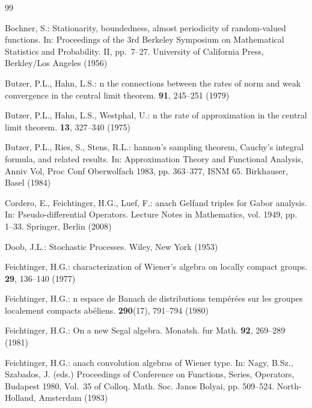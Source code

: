 \documentclass[graybox]{svmult}
\begin{document}

\begin{thebibliography}{99}

 Bochner, S.: Stationarity, boundedness, almost
   periodicity of random-valued functions. In: Proceedings of the 3rd
   Berkeley Symposium on Mathematical Statistics and Probability.  II,
   pp.~7--27.  University of California Press, Berkley/Los Angeles
   (1956)


Butzer, P.L., Hahn, L.S.:
n the connections between the rates of norm and weak convergence
in the central limit theorem.
 {\bf 91}, 245--251 (1979)

Butzer, P.L.,  Hahn, L.S.,  Westphal, U.:
n the rate of approximation in the central limit theorem.
 {\bf 13}, 327--340 (1975)

Butzer, P.L., Ries, S., Stens, R.L.:
hannon's sampling theorem, {C}auchy's integral formula, and
related results.
\newblock In: {{A}pproximation {T}heory and {F}unctional {A}nalysis, {A}nniv
{V}ol, {P}roc {C}onf {O}berwolfach 1983, pp. 363--377, ISNM 65}. Birkhauser, Basel
(1984)

Cordero, E., {F}eichtinger, H.G.,  Luef, F.:
anach {G}elfand triples for {G}abor analysis.
\newblock In: {{P}seudo-differential {O}perators}.  {{L}ecture {N}otes in {M}athematics},  vol. 1949, pp. 1--33. {S}pringer, {B}erlin (2008)

 Doob, J.L.: Stochastic Processes.  Wiley, New York (1953)

{F}eichtinger, H.G.:
 characterization of {W}iener's algebra on locally compact groups.
 {\bf 29}, 136--140 (1977)

{F}eichtinger, H.G.:
n espace de {B}anach de distributions temp{\'e}r{\'e}es sur les
groupes localement compacts ab{\'e}liens.
 {\bf 290}(17), 791--794 (1980)

 {F}eichtinger, H.G.:   On a new Segal algebra.
   Monatsh.  fur  Math.  {\bf 92},  269--289 (1981)

{F}eichtinger, H.G.:
anach convolution algebras of {W}iener type.
\newblock In:  {N}agy, {B}.{S}z.,  {S}zabados, {J}. ({e}ds.) {{P}roceedings of {C}onference on {F}unctions, {S}eries, {O}perators,
{B}udapest 1980}, Vol.~35 of {{C}olloq. {M}ath. {S}oc. {J}anos
{B}olyai}, pp. 509--524. {N}orth-{H}olland, {A}msterdam (1983)


\end{thebibliography}
\end{document}
